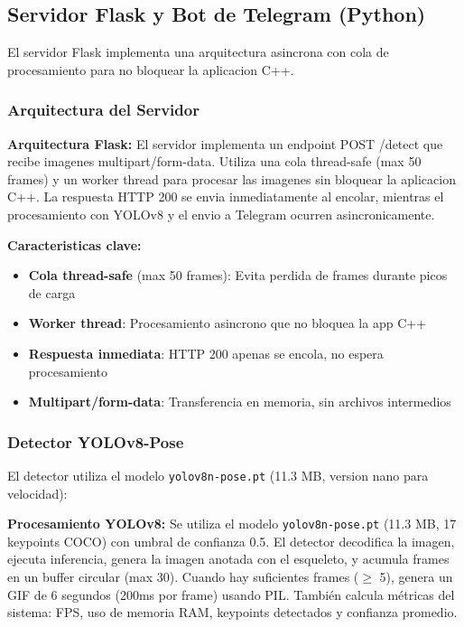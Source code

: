 \documentclass[conference]{IEEEtran}
\begin{document}
\subsection{Servidor Flask y Bot de Telegram (Python)}

El servidor Flask implementa una arquitectura asincrona con cola de procesamiento para no bloquear la aplicacion C++.

\subsubsection{Arquitectura del Servidor}

\textbf{Arquitectura Flask:} El servidor implementa un endpoint POST /detect que recibe imagenes multipart/form-data. Utiliza una cola thread-safe (max 50 frames) y un worker thread para procesar las imagenes sin bloquear la aplicacion C++. La respuesta HTTP 200 se envia inmediatamente al encolar, mientras el procesamiento con YOLOv8 y el envio a Telegram ocurren asincronicamente.

\textbf{Caracteristicas clave:}
\begin{itemize}
    \item \textbf{Cola thread-safe} (max 50 frames): Evita perdida de frames durante picos de carga
    \item \textbf{Worker thread}: Procesamiento asincrono que no bloquea la app C++
    \item \textbf{Respuesta inmediata}: HTTP 200 apenas se encola, no espera procesamiento
    \item \textbf{Multipart/form-data}: Transferencia en memoria, sin archivos intermedios
\end{itemize}

\subsubsection{Detector YOLOv8-Pose}

El detector utiliza el modelo \texttt{yolov8n-pose.pt} (11.3 MB, version nano para velocidad):

\textbf{Procesamiento YOLOv8:} Se utiliza el modelo \texttt{yolov8n-pose.pt} (11.3 MB, 17 keypoints COCO) con umbral de confianza 0.5. El detector decodifica la imagen, ejecuta inferencia, genera la imagen anotada con el esqueleto, y acumula frames en un buffer circular (max 30). Cuando hay suficientes frames ($\geq$ 5), genera un GIF de 6 segundos (200ms por frame) usando PIL. También calcula métricas del sistema: FPS, uso de memoria RAM, keypoints detectados y confianza promedio.
\end{document}
